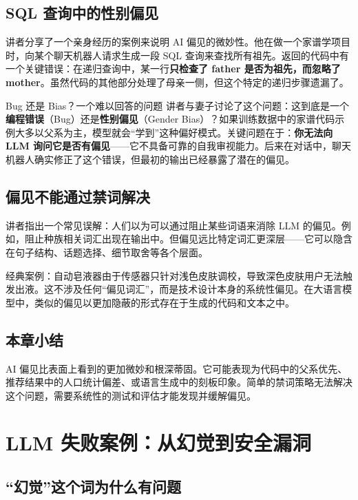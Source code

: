 \documentclass[a4paper]{article}
\begin{document}
\subsection{SQL 查询中的性别偏见}

讲者分享了一个亲身经历的案例来说明 AI 偏见的微妙性。他在做一个家谱学项目时，向某个聊天机器人请求生成一段 SQL 查询来查找所有祖先。返回的代码中有一个关键错误：在递归查询中，某一行\textbf{只检查了 father 是否为祖先，而忽略了 mother}。虽然代码的其他部分处理了母亲一侧，但这个特定的递归步骤遗漏了。

\begin{warningbox}{Bug 还是 Bias？一个难以回答的问题}
讲者与妻子讨论了这个问题：这到底是一个\textbf{编程错误}（Bug）还是\textbf{性别偏见}（Gender Bias）？如果训练数据中的家谱代码示例大多以父系为主，模型就会``学到''这种偏好模式。关键问题在于：\textbf{你无法向 LLM 询问它是否有偏见}——它不具备可靠的自我审视能力。后来在对话中，聊天机器人确实修正了这个错误，但最初的输出已经暴露了潜在的偏见。
\end{warningbox}

\subsection{偏见不能通过禁词解决}

讲者指出一个常见误解：人们以为可以通过阻止某些词语来消除 LLM 的偏见。例如，阻止种族相关词汇出现在输出中。但偏见远比特定词汇更深层——它可以隐含在句子结构、话题选择、细节取舍等各个层面。

经典案例：自动皂液器由于传感器只针对浅色皮肤调校，导致深色皮肤用户无法触发出液。这不涉及任何``偏见词汇''，而是技术设计本身的系统性偏见。在大语言模型中，类似的偏见以更加隐蔽的形式存在于生成的代码和文本之中。

\subsection{本章小结}

AI 偏见比表面上看到的更加微妙和根深蒂固。它可能表现为代码中的父系优先、推荐结果中的人口统计偏差、或语言生成中的刻板印象。简单的禁词策略无法解决这个问题，需要系统性的测试和评估才能发现并缓解偏见。

\section{LLM 失败案例：从幻觉到安全漏洞}

\subsection{``幻觉''这个词为什么有问题}
\end{document}
